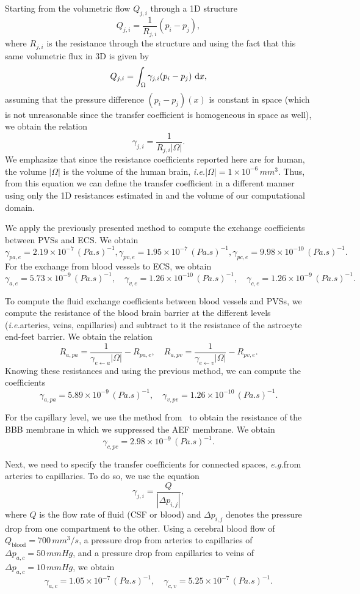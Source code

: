 \documentclass[10pt]{article}
\newcommand{\ie}{\emph{i.e.}\;}
\newcommand{\eg}{\emph{e.g.}\;}
\newcommand{\1}{^{(1)}}
\newcommand{\2}{^{(2)}}
\newcommand*{\dd}{\mathop{\kern0pt\mathrm{d}}\!{}}
\newcommand{\abs}[1]{\left\lvert#1\right\rvert}
\begin{document}
Starting from the volumetric flow $Q_{j, i}$ through a 1D structure 
\[
    Q_{j, i} = \frac{1}{R_{j, i}}(p_i-p_j),
\]
where $R_{j, i}$ is the resistance through the structure and using the fact that this same volumetric flux in 3D is given by 
\[
    Q_{j, i} = \int_\Omega \gamma_{j , i}(p_i-p_j)\, \dd x,
\]
assuming that the pressure difference $(p_i-p_j)(x)$ is constant in space (which is not unreasonable since the transfer coefficient is homogeneous in space as well), we obtain the relation 
\[
    \gamma_{j , i } = \frac{1}{R_{j , i } \abs{\Omega}}.
\]
We emphasize that since the resistance coefficients reported here are for human, the volume $\abs{\Omega}$ is the volume of the human brain, \ie $\abs{\Omega} = 1\times 10^{-6}\, \si{mm^3}$. 
Thus, from this equation we can define the transfer coefficient in a different manner using only the 1D resistances estimated in \cite{Vinje-2020-ICP} and the volume of our computational domain.  

We apply the previously presented method to compute the exchange coefficients between PVSs and ECS. We obtain 
\[
    \gamma_{pa,e } = 2.19 \times 10^{-7}\,  \si{(Pa.s)^{-1}}, \gamma_{pv,e} = 1.95 \times 10^{-7} \, \si{(Pa.s)^{-1}}, \gamma_{pc,e} = 9.98 \times 10^{-10} \, \si{(Pa.s)^{-1}}. 
\]
For the exchange from blood vessels to ECS, we obtain
\[
    \gamma_{a,e} = 5.73 \times 10^{-9} \, \si{(Pa.s)^{-1}},\quad \gamma_{v,e} = 1.26 \times 10^{-10} \, \si{(Pa.s)^{-1}}, \quad  \gamma_{c,e} = 1.26 \times 10^{-9} \, \si{(Pa.s)^{-1}}.
\]


To compute the fluid exchange coefficients between blood vessels and PVSs, we compute the resistance of the blood brain barrier at the different levels (\ie arteries, veins, capillaries) and subtract to it the resistance of the astrocyte end-feet barrier. We obtain the relation 
\[
    R_{a,pa} = \frac{1}{\gamma_{e\leftarrow a}\abs{\Omega}} - R_{pa,e},\quad R_{a,pv} = \frac{1}{\gamma_{e\leftarrow v}\abs{\Omega}} - R_{pv,e}.
\]
Knowing these resistances and using the previous method, we can compute the coefficients 
\[
\gamma_{a,pa} = 5.89 \times 10^{-9} \, \si{(Pa.s)^{-1}}, \quad \gamma_{v,pv} = 1.26 \times 10^{-10}  \, \si{(Pa.s)^{-1}}. 
\]

For the capillary level, we use the method from~\cite{shi-2014-Quantification} to obtain the resistance of the BBB membrane in which we suppressed the AEF membrane. We obtain
\[
    \gamma_{c,pc} = 2.98 \times 10^{-9}\, \si{(Pa.s)^{-1}}. 
\]

Next, we need to specify the transfer coefficients for connected spaces, \eg from arteries to capillaries. To do so, we use the equation
\[
    \gamma_{j,i} = \frac{Q}{\abs{\Delta p_{i,j}}}, 
\]
where $Q$ is the flow rate of fluid (CSF or blood) and $\Delta p_{i,j}$ denotes the pressure drop from one compartment to the other. Using a cerebral blood flow of $Q_\text{blood} = 700 \, \si{mm^3/s}$, a pressure drop from arteries to capillaries of $\Delta p_{a,c} = 50 \,\si{mmHg}$, and a pressure drop from capillaries to veins of $\Delta p_{a,c} = 10\, \si{mmHg}$, we obtain 
\[
    \gamma_{a,c} = 1.05 \times 10^{-7} \, \si{(Pa.s)^{-1}},\quad \gamma_{c,v} = 5.25  \times 10^{-7}\, \si{(Pa.s)^{-1}}.
\]
\end{document}
